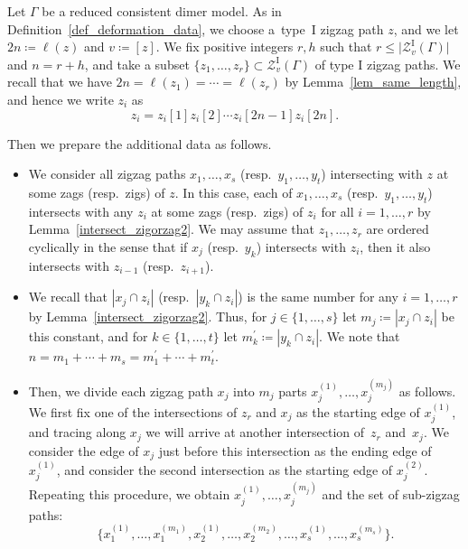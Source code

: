 \documentclass[11pt]{article}
\numberwithin{equation}{section}
\numberwithin{equation}{section}
\numberwithin{figure}{section}
\numberwithin{table}{section}
\newcommand{\rmI}{\mathrm{I}}
\newcommand{\calZ}{\mathcal{Z}}
\begin{document}
\begin{setting}\label{def_deformation_exdata}
Let $\Gamma$ be a reduced consistent dimer model.
As in Definition~\ref{def_deformation_data}, we choose a~type~I zigzag path $z$, and we let $2n\coloneqq\ell(z)$ and $v\coloneqq [z]$.
We fix positive integers $r, h$ such that $r\le \big|\calZ_v^\rmI(\Gamma)\big|$ and $n=r+h$,
and take a subset $\{z_1,\dots,z_r\}\subset\calZ_v^\rmI(\Gamma)$ of type I zigzag paths.
We recall that we have $2n=\ell(z_1)=\cdots=\ell(z_r)$ by Lemma~\ref{lem_same_length}, and hence we write $z_i$ as
\begin{displaymath}
z_i=z_i[1]z_i[2]\cdots z_i[2n-1]z_i[2n].
\end{displaymath}

Then we prepare the additional data as follows.
\begin{itemize}\itemsep=0pt
\item[(1)] We consider all zigzag paths $x_1,\dots, x_s$ (resp.~$y_1,\dots, y_t$) intersecting with $z$ at some zags (resp.\ zigs) of $z$.
In this case, each of $x_1,\dots, x_s$ (resp.\ $y_1,\dots, y_t$) intersects with any $z_i$ at some zags (resp.\ zigs) of $z_i$ for all $i=1,\dots,r$ by Lemma~\ref{intersect_zigorzag2}.
We may assume that $z_1,\dots,z_r$ are ordered cyclically in the sense that if $x_j$ (resp.~$y_k$) intersects with $z_i$,
then it also intersects with $z_{i-1}$ (resp.~$z_{i+1}$).
\item[(2)]
We recall that $|x_j\cap z_i|$ (resp.~$|y_k\cap z_i|$) is the same number for any $i=1,\dots,r$ by Lemma~\ref{intersect_zigorzag2}.
Thus, for $j\in\{1,\dots, s\}$ let $m_j\coloneqq|x_j\cap z_i|$ be this constant, and for $k\in\{1,\dots, t\}$ let $m^\prime_k\coloneqq|y_k\cap z_i|$.
We note that $n=m_1+\cdots+m_s=m^\prime_1+\cdots+m^\prime_t$.
\item[(3)] Then, we divide each zigzag path $x_j$ into $m_j$ parts $x_j^{(1)},\dots,x_j^{(m_j)}$ as follows.
We first fix one of the intersections of $z_r$ and $x_j$ as the starting edge of $x_j^{(1)}$,
and tracing along $x_j$ we will arrive at another intersection of~$z_r$ and~$x_j$.
We consider the edge of $x_j$ just before this intersection as the ending edge of $x_j^{(1)}$, and consider the second intersection as the starting edge of $x_j^{(2)}$.
Repeating this procedure, we obtain $x_j^{(1)},\dots,x_j^{(m_j)}$ and the set of sub-zigzag paths:
\begin{equation}\label{subzigzag_x}
\big\{x_1^{(1)},\dots,x_1^{(m_1)}, x_2^{(1)},\dots,x_2^{(m_2)}, \dots, x_s^{(1)},\dots,x_s^{(m_s)}\big\}.
\end{equation}


\end{itemize}
\end{setting}
\end{document}
